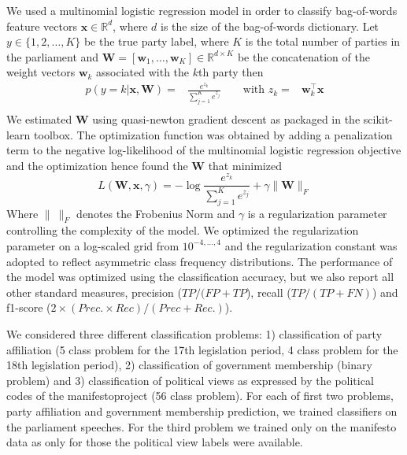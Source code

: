 \documentclass[runningheads,a4paper]{llncs}
\renewcommand{\vec}[1]{\mathbf{#1}}
\newcommand{\R}{\mathds{R}}
\begin{document}
We used a multinomial logistic regression model in order to classify bag-of-words feature vectors $\vec{x}\in\R^d$, where $d$ is the size of the bag-of-words dictionary. Let $y\in\{1,2,\dots,K\}$ be the true party label, where $K$ is the total number of parties in the parliament and $\vec{W}=[\vec{w}_1,\dots,\vec{w}_K]\in\R^{d\times K}$ be the concatenation of the weight vectors $\vec{w}_k$ associated with the $k$th party then 
\begin{eqnarray}\label{eq:logreg_multiclass}
p(y=k|\vec{x},\vec{W}) = &\frac{e^{z_k}}{\sum_{j=1}^K e^{z_j}} \qquad \textrm{with }  z_k=&\vec{w}_k^{\top}\vec{x} \\\nonumber
\end{eqnarray}
%
We estimated $\vec{W}$ using quasi-newton gradient descent as packaged in the scikit-learn toolbox. The optimization function was obtained by adding a penalization term to the negative log-likelihood of the multinomial logistic regression objective and the optimization hence found the $\vec{W}$ that minimized
\begin{equation}\label{eq:objective}
L(\vec{W}, \vec{x}, \gamma) = - \log{\frac{e^{z_k}}{\sum_{j=1}^K e^{z_j}}}+ \gamma \| \vec{W} \|_{F}
\end{equation}
Where $\|~\|_F$ denotes the Frobenius Norm and $\gamma$ is a regularization parameter controlling the complexity of the model. 
 We optimized the regularization parameter on a log-scaled grid from $10^{-4,\dots,4}$ and the regularization constant was adopted to reflect asymmetric class frequency distributions. The performance of the model was optimized using the classification accuracy, but we also report all other standard measures, precision ($TP / (FP + TP$), recall ($TP / (TP + FN)$) and f1-score ($2\times (Prec. \times Rec) / (Prec + Rec.)$). 

We considered three different classification problems: 1) classification of party affiliation (5 class problem for the 17th legislation period, 4 class problem for the 18th legislation period), 2) classification of government membership (binary problem) and 3) classification of political views as expressed by the political codes of the manifestoproject (56 class problem). For each of first two problems, party affiliation and government membership prediction, we trained classifiers on the parliament speeches. For the third problem we trained only on the manifesto data as only for those the political view labels were available. 
\end{document}
